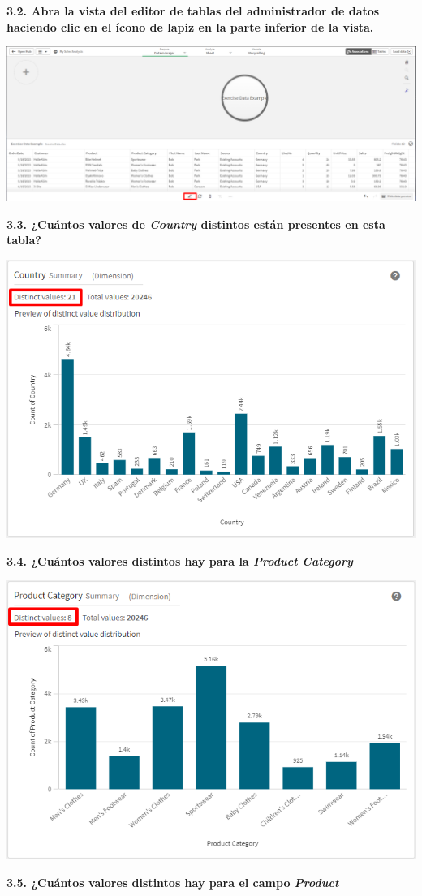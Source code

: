 \documentclass{article}
\begin{document}
	\newpage
\textbf{3.2. Abra la vista del editor de tablas del 
administrador de datos haciendo clic en el ícono de lapiz
 en la parte inferior de la vista.}

    \begin{center}
		\includegraphics[width=14cm]{./images/5} 
	\end{center}

\textbf{3.3. ¿Cuántos valores de 
\textit{\textbf{Country}} distintos están presentes en esta tabla?}

    \begin{center}
		\includegraphics[width=14cm]{./images/6.1} 
	\end{center}
	\newpage
\textbf{3.4. ¿Cuántos valores
 distintos hay para la \textit{\textbf{Product Category}}}

    \begin{center}
		\includegraphics[width=14cm]{./images/6.2} 
	\end{center}
	\newpage
\textbf{3.5. ¿Cuántos valores distintos
 hay para el campo \textit{\textbf{Product}}}
\end{document}
